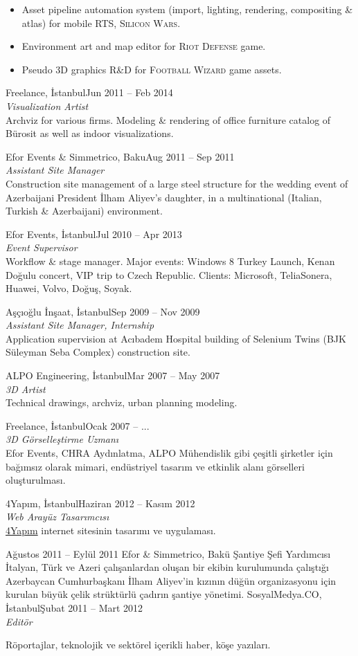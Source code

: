 \documentclass[8pt]{scrartcl}
\newenvironment{xplist}{%
  \newcommand\xpitem[4]{%
    {\color{header}%
      \sc##2\hfill ##1}\\[2pt]
    {\Large\textit{##3}
      \smallskip} \\%
    {##4\bigskip}%

  }}%
{\setlist{}}
\newcommand{\project}[1]{\textsc{\color{teal}#1}}
\begin{document}
\begin{xplist}
{{      \begin{itemize}
      \item  Asset  pipeline   automation  system  (import,  lighting,
        rendering,   compositing    \&   atlas)   for    mobile   RTS,
        \project{Silicon Wars}.
      \item Environment art and  map editor for \project{Riot Defense}
        game.
      \item Pseudo 3D graphics R\&D for \project{Football Wizard} game
        assets.
      \end{itemize}}%
    \xpitem%
    {Jun 2011 -- Feb 2014}%
    {Freelance, İstanbul}%
    {Visualization Artist}{%
      Archviz  for various  firms.   Modeling \&  rendering of  office
      furniture catalog of Bürosit as well as indoor visualizations.}%
    \xpitem%
    {Aug 2011 -- Sep 2011}%
    {Efor Events \& Simmetrico, Baku}%
    {Assistant Site Manager}{%
      Construction site management of a  large steel structure for the
      wedding event of Azerbaijani  President İlham Aliyev's daughter,
      in   a   multinational   (Italian,   Turkish   \&   Azerbaijani)
      environment.}%
    \xpitem%
    {Jul 2010 -- Apr 2013}%
    {Efor Events, İstanbul}%
    {Event Supervisor}{%
      Workflow  \&  stage manager.   Major  events:  Windows 8  Turkey
      Launch,  Kenan  Doğulu  concert,  VIP trip  to  Czech  Republic.
      Clients: Microsoft, TeliaSonera, Huawei, Volvo, Doğuş, Soyak.}%
    \xpitem%
    {Sep 2009 -- Nov 2009}%
    {Aşçıoğlu İnşaat, İstanbul}%
    {Assistant Site Manager, Internship}{%
      Application  supervision   at  Acıbadem  Hospital   building  of
      Selenium Twins (BJK Süleyman Seba Complex) construction site.}%
    \xpitem%
    {Mar 2007 -- May 2007}%
    {ALPO Engineering, İstanbul}%
    {3D Artist}{%
      Technical drawings, archviz, urban planning modeling.}}%
  {%
    \xpitem%
    {Ocak 2007 -- ...}%
    {Freelance, İstanbul}%
    {3D Görselleştirme Uzmanı}{%
      Efor  Events, CHRA  Aydınlatma,  ALPO  Mühendislik gibi  çeşitli
      şirketler için  bağımsız olarak  mimari, endüstriyel  tasarım ve
      etkinlik alanı görselleri oluşturulması.}%
    \xpitem%
    {Haziran 2012 -- Kasım 2012}%
    {4Yapım, İstanbul}%
    {Web Arayüz Tasarımcısı}{%
      \href{http://www.4yapim.com/}{4Yapım}     internet     sitesinin
      tasarımı ve uygulaması.}%
    \xpitme%
    {Ağustos 2011 -- Eylül 2011}%
    {Efor \& Simmetrico, Bakü}%
    {Şantiye Şefi Yardımcısı}{%
      İtalyan,  Türk   ve  Azeri   çalışanlardan  oluşan   bir  ekibin
      kurulumunda çalıştığı  Azerbaycan Cumhurbaşkanı  İlham Aliyev'in
      kızının düğün organizasyonu için  kurulan büyük çelik strüktürlü
      çadırın şantiye yönetimi.}%
    \xpitem%
    {Şubat 2011 -- Mart 2012}%
    {SosyalMedya.CO, İstanbul}%
    {Editör}{%
      Röportajlar,  teknolojik   ve  sektörel  içerikli   haber,  köşe
      yazıları.

}}
\end{xplist}
\end{document}
